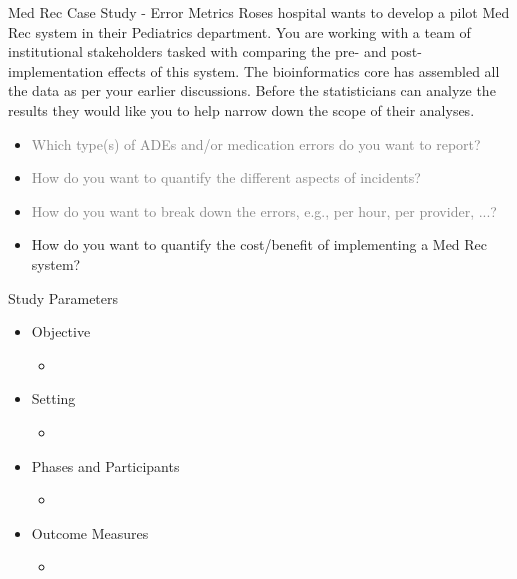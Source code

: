 \documentclass[10pt]{beamer}
\begin{document}
\begin{frame}{Med Rec Case Study - Error Metrics}
	Roses hospital wants to develop a pilot Med Rec system in their Pediatrics department.  You are working with a team of institutional stakeholders tasked with comparing the pre- and post-implementation effects of this system.  The bioinformatics core has assembled all the data as per your earlier discussions.  Before the statisticians can analyze the results they would like you to help narrow down the scope of their analyses.
	\begin{itemize}
		\item \textcolor<2->{gray}{Which type(s) of ADEs and/or medication errors do you want to report?}
		\item \textcolor<2->{gray}{How do you want to quantify the different aspects of incidents?}
		\item \textcolor<2->{gray}{How do you want to break down the errors, e.g., per hour, per provider, ...?}
		\item<2-> How do you want to quantify the cost/benefit of implementing a Med Rec system?
	\end{itemize}	 
\end{frame}


\begin{frame}{Study Parameters}
	\begin{itemize}
		\item Objective
			\begin{itemize}
			\item 
			\end{itemize}
		\item Setting
			\begin{itemize}
			\item 
			\end{itemize}
		\item Phases and Participants
			\begin{itemize}
			\item 
			\end{itemize}
		\item Outcome Measures
			\begin{itemize}
			\item 
			\end{itemize}
	\end{itemize}
\end{frame}
\end{document}
